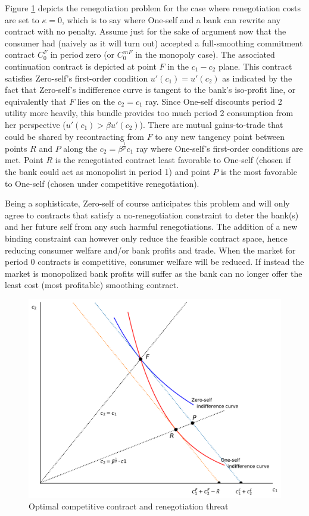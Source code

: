 \documentclass[11pt,english]{article}
\theoremstyle{plain}
\theoremstyle{definition}
\begin{document}
Figure \ref{fig:c1c2} depicts the renegotiation problem for the case where renegotiation costs are
set to $\kappa=0$, which is to say where One-self and a bank can rewrite
any contract with no penalty. Assume \textendash{} just for the sake
of argument now \textendash{} that the consumer had (naively as it
will turn out) accepted a full-smoothing commitment contract $C_{0}^{F}$
in period zero (or $C_{0}^{mF}$ in the monopoly case). The associated
continuation contract is depicted at point $F$ in the $c_{1}-c_{2}$
plane. This contract satisfies Zero-self's first-order condition $u'(c_{1})=u'(c_{2})$
as indicated by the fact that Zero-self's indifference curve is tangent
to the bank's iso-profit line, or equivalently that \(F\) lies on the \(c_2=c_1\) ray. Since One-self discounts period 2 utility
more heavily, this bundle provides too much period 2 consumption from her perspective ($u'(c_{1})>\beta u'(c_{2})$). There are mutual gains-to-trade that could be shared by recontracting
from $F$ to any new tangency point between points \(R\) and \(P\) along the $c_{2}=\beta^{\frac{1}{\rho}}c_{1}$
ray where One-self's first-order conditions are met. Point
$R$ is the renegotiated contract least favorable to One-self
(chosen if the bank could act as monopolist in period 1) and point
$P$ is the most favorable to One-self
(chosen under competitive renegotiation).


Being a sophisticate, Zero-self of course anticipates this problem and will only agree to contracts that satisfy a no-renegotiation constraint
to deter the bank(s) and her future self from any such harmful renegotiations. The addition of a new binding constraint can however only reduce the feasible contract space, hence reducing
consumer welfare and/or bank profits and trade. When the market for
period 0 contracts is competitive, consumer welfare will be reduced.
If instead the market is monopolized bank profits will suffer as the
bank can no longer offer the least cost (most profitable) smoothing
contract.

\begin{figure}[p]
  \includegraphics[scale=0.7]{Figure1.pdf}
  \caption{Optimal competitive contract and renegotiation threat}
  \label{fig:c1c2}
\end{figure}
\end{document}

